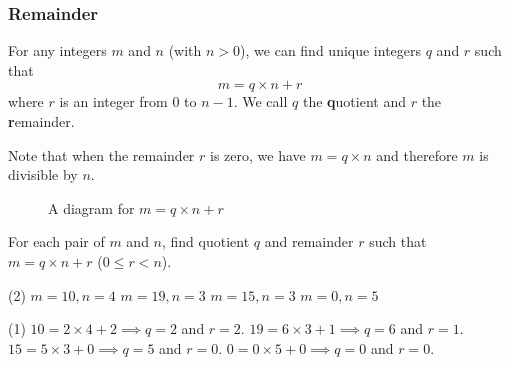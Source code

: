 \begin{frame}
\frametitle{Remainder}
\begin{defn}{}{}
For any integers $m$ and $n$ (with $n > 0$), we can find unique integers $q$ and $r$ such that
\[m = q \times n + r\]
where $r$ is an integer from 0 to $n-1$. We call $q$ the \textbf{q}uotient and $r$ the \textbf{r}emainder.
\end{defn}

Note that when the remainder $r$ is zero, we have $m = q \times n$ and therefore $m$ is divisible by $n$.
\end{frame}

\begin{frame}{}
\begin{figure}[h!]
\centering
{}
\caption{A diagram for $m = q \times n + r$}
\end{figure}
\end{frame}

\begin{frame}[t]
\begin{ex}
For each pair of $m$ and $n$, find quotient $q$ and remainder $r$ such that $m = q \times n + r$ ($0 \le r < n$).
\begin{tasks}(2)
\task $m=10, n = 4$
\task $m=19, n = 3$
\task $m = 15, n = 3$
\task $m = 0, n = 5$
\end{tasks}
\end{ex}
\begin{sol}
\begin{tasks}(1)
\task $10 = 2 \times 4 + 2 \implies q = 2$ and $r = 2$.
\task $19 = 6 \times 3 + 1 \implies q = 6$ and $r = 1$.
\task $15 = 5 \times 3 + 0 \implies q = 5$ and $r = 0$.
\task $0 = 0 \times 5 + 0 \implies q = 0$ and $r = 0$.
\end{tasks}
\end{sol}
\end{frame}

